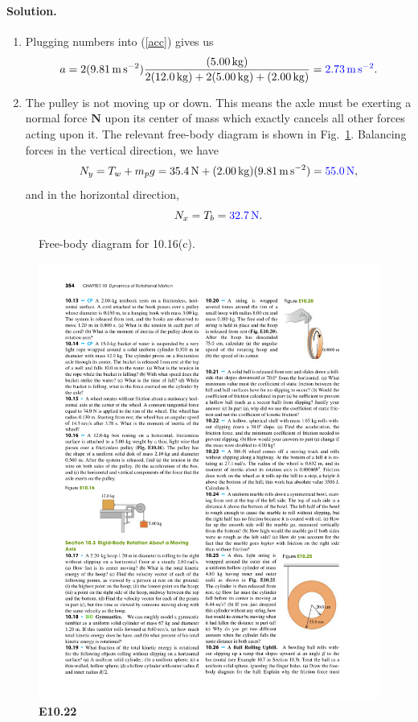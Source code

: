 \documentclass[11pt]{article}
\newcommand{\refeq}[1]{(\ref{#1})}
\newcommand{\beq}{\begin{equation*}}
\newcommand{\eeq}{\end{equation*}}
\newenvironment{solution}
{
    \paragraph{Solution.}
    \ignorespaces
}
{
    \bigskip
}
\renewcommand{\vec}[1]{\mathbf{#1}}
\begin{document}
\begin{solution}
\begin{enumerate}
		\item Plugging numbers into \refeq{acc} gives us
			\beq
				a = 2 (\sig) \frac{(\simw)}{2 (\simb) + 2 (\simw) + (\simp)} = {\color{blue} \SI{2.73}{\meter\per\square\second}}.
			\eeq
			
		\item The pulley is not moving up or down.  This means the axle must be exerting a normal force $\vec{N}$ upon its center of mass which exactly cancels all other forces acting upon it.  The relevant free-body diagram is shown in Fig.~\ref{E10.16c}.  Balancing forces in the vertical direction, we have
		\beq
			\Ny = \Tw + \mmp g = \SI{35.4}{\newton} + (\simp) (\sig) = {\color{blue} \SI{55.0}{\newton}},
		\eeq
		and in the horizontal direction,
		\beq
			\Nx = \Tb = {\color{blue} \SI{32.7}{\newton}}.
		\eeq
	\end{enumerate}
\end{solution}

\begin{figure}
	\vspace{1.5in}
	\caption{Free-body diagram for 10.16(c).}
	\label{E10.16c}
\end{figure}


\clearpage
\begin{figure} \centering
	\includegraphics{E10-22}
	\caption{\textbf{E10.22}}
	\label{E10.22}
\end{figure}
\end{document}
